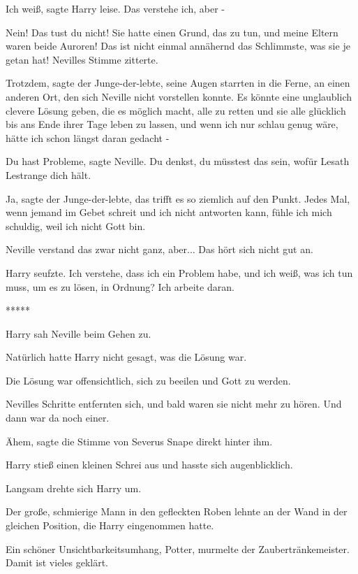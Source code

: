 \glqq{}Ich weiß\grqq{}, sagte Harry leise. \glqq{}Das verstehe ich, aber
-\grqq{}

\glqq{}Nein! Das tust du nicht! Sie hatte einen Grund, das zu tun, und meine
Eltern waren beide Auroren! Das ist nicht einmal annähernd das Schlimmste, was
sie je getan hat!\grqq{} Nevilles Stimme zitterte.

\glqq{}Trotzdem\grqq{}, sagte der Junge-der-lebte, seine Augen starrten in die
Ferne, an einen anderen Ort, den sich Neville nicht vorstellen konnte. \glqq{}Es
könnte eine unglaublich clevere Lösung geben, die es möglich macht, alle zu
retten und sie alle glücklich bis ans Ende ihrer Tage leben zu lassen, und wenn
ich nur schlau genug wäre, hätte ich schon längst daran gedacht -\grqq{}

\glqq{}Du hast Probleme\grqq{}, sagte Neville. \glqq{}Du denkst, du müsstest das
sein, wofür Lesath Lestrange dich hält.\grqq{}

\glqq{}Ja\grqq{}, sagte der Junge-der-lebte, \glqq{}das trifft es so ziemlich
auf den Punkt. Jedes Mal, wenn jemand im Gebet schreit und ich nicht antworten
kann, fühle ich mich schuldig, weil ich nicht Gott bin.\grqq{}

Neville verstand das zwar nicht ganz, aber... \glqq{}Das hört sich nicht gut
an.\grqq{}

Harry seufzte. \glqq{}Ich verstehe, dass ich ein Problem habe, und ich weiß, was
ich tun muss, um es zu lösen, in Ordnung? Ich arbeite daran.\grqq{}

\begin{center}*****\end{center}

Harry sah Neville beim Gehen zu.

Natürlich hatte Harry nicht gesagt, was die Lösung war.

Die Lösung war offensichtlich, sich zu beeilen und Gott zu werden.

Nevilles Schritte entfernten sich, und bald waren sie nicht mehr zu hören. Und
dann war da noch einer.

\glqq{}Ähem\grqq{}, sagte die Stimme von Severus Snape direkt hinter ihm.

Harry stieß einen kleinen Schrei aus und hasste sich augenblicklich.

Langsam drehte sich Harry um.

Der große, schmierige Mann in den gefleckten Roben lehnte an der Wand in der
gleichen Position, die Harry eingenommen hatte.

\glqq{}Ein schöner Unsichtbarkeitsumhang, Potter\grqq{}, murmelte der
Zaubertränkemeister. \glqq{}Damit ist vieles geklärt.\grqq{}

